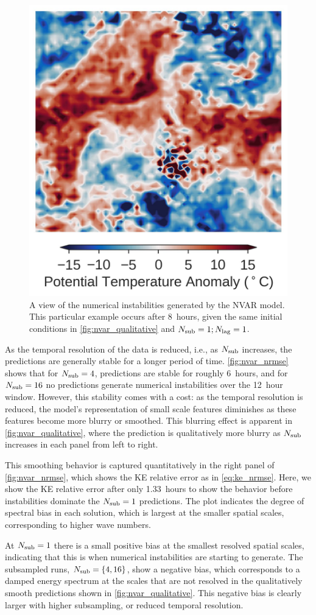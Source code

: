 \begin{figure}
    \centering
    \includegraphics[width=.3\textwidth]{../figures/nvar_instabilities.jpg}
    \caption{A view of the numerical instabilities generated by the NVAR model.
        This particular example occurs after 8~hours, given the same initial
        conditions in \cref{fig:nvar_qualitative} and $N_\text{sub}=1; N_\text{lag}=1$.
    }

    \label{fig:nvar_instabilities}
\end{figure}

As the temporal resolution of the data is reduced, i.e., as $N_\text{sub}$ increases,
the predictions are generally stable for a longer period of time.
\cref{fig:nvar_nrmse} shows that for $N_\text{sub}=4$, predictions are stable for roughly
6~hours, and for $N_\text{sub}=16$ no predictions generate numerical instabilities over the
12~hour window.
However, this stability comes with a cost: as the temporal resolution is
reduced, the model's representation of small scale features diminishes as these
features become more blurry or smoothed. This blurring effect is apparent in \cref{fig:nvar_qualitative}, where the prediction is qualitatively more blurry as $N_\text{sub}$ increases in each panel from left to right.

This smoothing behavior is captured quantitatively in the right panel of
\cref{fig:nvar_nrmse},
which shows the KE relative error as in \cref{eq:ke_nrmse}.
Here, we show the KE relative error after only 1.33~hours to show the behavior
before instabilities dominate the $N_\text{sub}=1$ predictions.
The plot indicates the degree of spectral bias in each solution, which is
largest at the smaller spatial scales, corresponding to higher wave numbers.

At $N_\text{sub}=1$ there is a small positive bias at the smallest resolved spatial
scales, indicating that this is when numerical instabilities are starting to
generate.
The subsampled runs, $N_\text{sub}=\{4,16\}$, show a negative bias, which corresponds
to a damped energy spectrum at the scales that are not resolved in the
qualitatively smooth predictions shown in \cref{fig:nvar_qualitative}.
This negative bias is clearly larger with higher subsampling, or reduced
temporal resolution.


